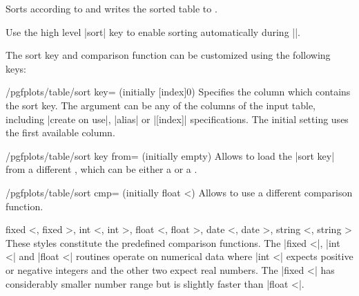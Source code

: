 \begin{command}{\pgfplotstablesort{}}
	Sorts  according to  and writes the sorted table to .

	Use the high level |sort| key to enable sorting automatically during |\pgfplotstabletypeset|.

\begin{codeexample}[]
\pgfplotstablesort[row sep=\\]
\pgfplotstabletypeset[columns/c/.style={string type}]{\result}%
\end{codeexample}
	
	The sort key and comparison function can be customized using the following keys:
	\begin{key}{/pgfplots/table/sort key= (initially [index]0)}
		Specifies the column which contains the sort key. The argument  can be any of the columns of the input table, including |create on use|, |alias| or |[index]| specifications. The initial setting uses the first available column.
	\end{key}
	\begin{key}{/pgfplots/table/sort key from= (initially empty)}
		Allows to load the |sort key| from a different , which can be either a  or a .
	\end{key}

	\begin{key}{/pgfplots/table/sort cmp= (initially float <)}
		Allows to use a different comparison function.
		\begin{pgfplotskeylist}{%
			fixed <,
			fixed >,
			int <,
			int >,
			float <,
			float >,
			date <,
			date >,
			string <,
			string >}
			These styles constitute the predefined comparison functions. The |fixed <|, |int <| and |float <| routines operate on numerical data where |int <| expects positive or negative integers and the other two expect real numbers. The |fixed <| has considerably smaller number range but is slightly faster than |float <|.


\end{pgfplotskeylist}
\end{key}
\end{command}
